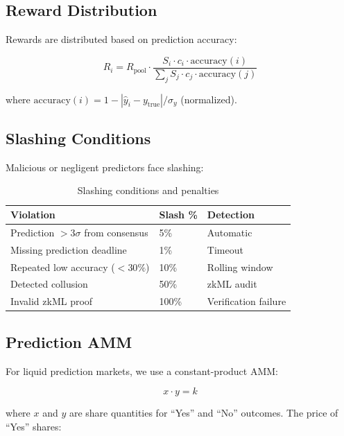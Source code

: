 \documentclass[11pt,a4paper]{article}
\begin{document}
\subsection{Reward Distribution}

Rewards are distributed based on prediction accuracy:

\begin{equation}
R_i = R_{\text{pool}} \cdot \frac{S_i \cdot c_i \cdot \text{accuracy}(i)}{\sum_j S_j \cdot c_j \cdot \text{accuracy}(j)}
\end{equation}

where $\text{accuracy}(i) = 1 - |\hat{y}_i - y_{\text{true}}|/\sigma_y$ (normalized).

\subsection{Slashing Conditions}

Malicious or negligent predictors face slashing:

\begin{table}[h]
\centering
\begin{tabular}{lll}
\toprule
\textbf{Violation} & \textbf{Slash \%} & \textbf{Detection} \\
\midrule
Prediction $> 3\sigma$ from consensus & 5\% & Automatic \\
Missing prediction deadline & 1\% & Timeout \\
Repeated low accuracy ($< 30\%$) & 10\% & Rolling window \\
Detected collusion & 50\% & zkML audit \\
Invalid zkML proof & 100\% & Verification failure \\
\bottomrule
\end{tabular}
\caption{Slashing conditions and penalties}
\end{table}

\subsection{Prediction AMM}

For liquid prediction markets, we use a constant-product AMM:

\begin{equation}
x \cdot y = k
\end{equation}

where $x$ and $y$ are share quantities for ``Yes'' and ``No'' outcomes. The price of ``Yes'' shares:
\end{document}
